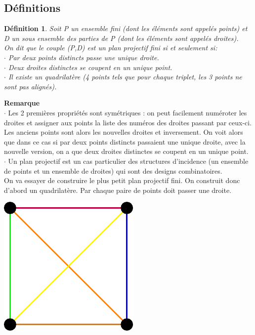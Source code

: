 \documentclass[a4paper]{article}
\newtheorem{Def}{Définition}[section]
\begin{document}
\subsection{Définitions}
\begin{Def}
Soit P un ensemble fini (dont les éléments sont appelés \emph{points}) et D un sous ensemble des parties de P (dont les éléments sont appelés \emph{droites}). \\
On dit que le couple (P,D) est un \emph{plan projectif fini} si et seulement si: \\
$\cdot$ Par deux points distincts passe une unique droite. \\
$\cdot$ Deux droites distinctes se coupent en un unique point. \\
$\cdot$ Il existe un quadrilatère (4 points tels que pour chaque triplet, les 3 points ne sont pas alignés).
\end{Def}
\textbf{Remarque}\\
  $\cdot$ Les 2 premières propriétés sont symétriques : on peut facilement numéroter les droites et assigner aux points la liste des numéros des droites passant par ceux-ci. Les anciens points sont alors les nouvelles droites et inversement. On voit alors que dans ce cas si par deux points distincts passaient une unique droite, avec la nouvelle version, on a que deux droites distinctes se coupent en un unique point. \\
$\cdot$ Un plan projectif est un cas particulier des structures d'incidence (un ensemble de points et un ensemble de droites) qui sont des designs combinatoires.\bigskip\\
On va essayer de construire le plus petit plan projectif fini. On construit donc d'abord un quadrilatère. Par chaque paire de points doit passer une droite.
\begin{center}
\includegraphics[scale=0.5]{planproj1.pdf}
\end{center}
\end{document}
